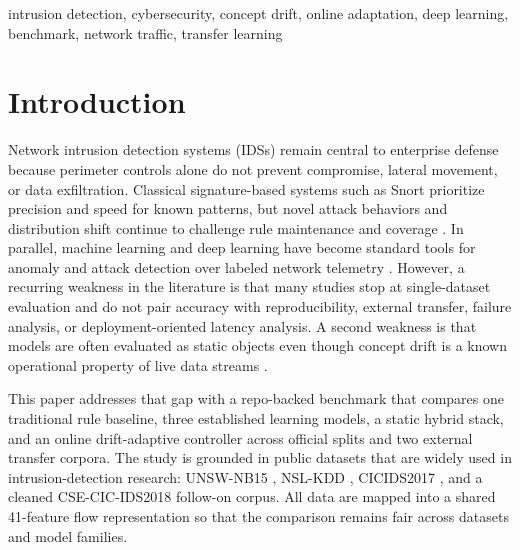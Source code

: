 \documentclass[conference]{IEEEtran}
\begin{document}
\begin{IEEEkeywords}
intrusion detection, cybersecurity, concept drift, online adaptation, deep learning, benchmark, network traffic, transfer learning
\end{IEEEkeywords}

\section{Introduction}
Network intrusion detection systems (IDSs) remain central to enterprise defense because perimeter controls alone do not prevent compromise, lateral movement, or data exfiltration. Classical signature-based systems such as Snort prioritize precision and speed for known patterns, but novel attack behaviors and distribution shift continue to challenge rule maintenance and coverage \cite{roesch1999snort}. In parallel, machine learning and deep learning have become standard tools for anomaly and attack detection over labeled network telemetry \cite{kasongo2020unsw}. However, a recurring weakness in the literature is that many studies stop at single-dataset evaluation and do not pair accuracy with reproducibility, external transfer, failure analysis, or deployment-oriented latency analysis. A second weakness is that models are often evaluated as static objects even though concept drift is a known operational property of live data streams \cite{gama2014survey}.

This paper addresses that gap with a repo-backed benchmark that compares one traditional rule baseline, three established learning models, a static hybrid stack, and an online drift-adaptive controller across official splits and two external transfer corpora. The study is grounded in public datasets that are widely used in intrusion-detection research: UNSW-NB15 \cite{moustafa2015unsw}, NSL-KDD \cite{tavallaee2009kdd}, CICIDS2017 \cite{sharafaldin2018cicids}, and a cleaned CSE-CIC-IDS2018 follow-on corpus. All data are mapped into a shared 41-feature flow representation so that the comparison remains fair across datasets and model families.
\end{document}
